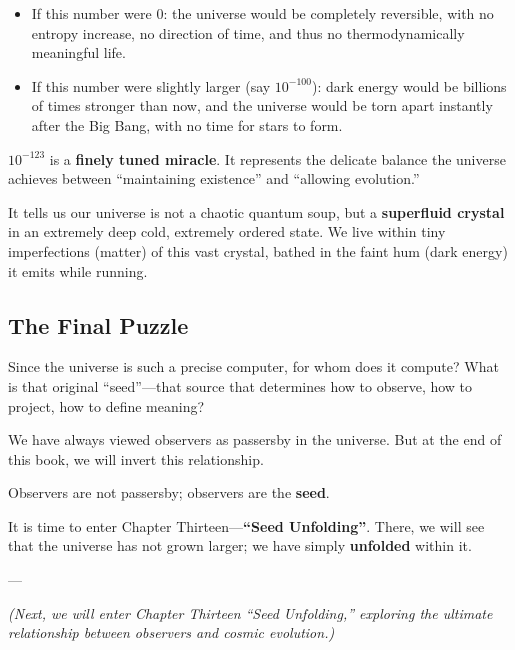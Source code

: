 \begin{itemize}
\item If this number were 0: the universe would be completely reversible, with no entropy increase, no direction of time, and thus no thermodynamically meaningful life.

\item If this number were slightly larger (say $10^{-100}$): dark energy would be billions of times stronger than now, and the universe would be torn apart instantly after the Big Bang, with no time for stars to form.
\end{itemize}

$10^{-123}$ is a \textbf{finely tuned miracle}. It represents the delicate balance the universe achieves between ``maintaining existence'' and ``allowing evolution.''

It tells us our universe is not a chaotic quantum soup, but a \textbf{superfluid crystal} in an extremely deep cold, extremely ordered state. We live within tiny imperfections (matter) of this vast crystal, bathed in the faint hum (dark energy) it emits while running.

\subsection{The Final Puzzle}

Since the universe is such a precise computer, for whom does it compute? What is that original ``seed''---that source that determines how to observe, how to project, how to define meaning?

We have always viewed observers as passersby in the universe. But at the end of this book, we will invert this relationship.

Observers are not passersby; observers are the \textbf{seed}.

It is time to enter Chapter Thirteen---\textbf{``Seed Unfolding''}. There, we will see that the universe has not grown larger; we have simply \textbf{unfolded} within it.

---

\textit{(Next, we will enter Chapter Thirteen ``Seed Unfolding,'' exploring the ultimate relationship between observers and cosmic evolution.)}

